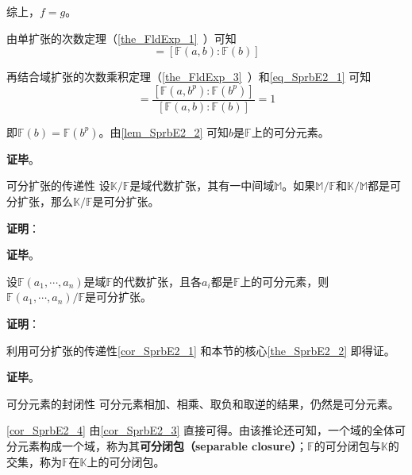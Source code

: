 综上，$f=g$。

由单扩张的次数定理（\autoref{the_FldExp_1}~）可知
\begin{equation}
[\mathbb{F}(a, b^p):\mathbb{F}(b^p)] = [\mathbb{F}(a, b):\mathbb{F}(b)]
\end{equation}

再结合域扩张的次数乘积定理（\autoref{the_FldExp_3}~）和\autoref{eq_SprbE2_1} 可知
\begin{equation}
[\mathbb{F}(b):\mathbb{F}(b^p)] = \frac{[\mathbb{F}(a, b^p):\mathbb{F}(b^p)]}{[\mathbb{F}(a, b):\mathbb{F}(b)]} = 1
\end{equation}

即$\mathbb{F}(b)=\mathbb{F}(b^p)$。由\autoref{lem_SprbE2_2} 可知$b$是$\mathbb{F}$上的可分元素。

\textbf{证毕}。











\begin{corollary}{可分扩张的传递性}\label{cor_SprbE2_1}
设$\mathbb{K}/\mathbb{F}$是域代数扩张，其有一中间域$\mathbb{M}$。如果$\mathbb{M}/\mathbb{F}$和$\mathbb{K}/\mathbb{M}$都是可分扩张，那么$\mathbb{K}/\mathbb{F}$是可分扩张。
\end{corollary}

\textbf{证明}：



\textbf{证毕}。





\begin{corollary}{}\label{cor_SprbE2_3}
设$\mathbb{F}(a_1, \cdots, a_n)$是域$\mathbb{F}$的代数扩张，且各$a_i$都是$\mathbb{F}$上的可分元素，则$\mathbb{F}(a_1, \cdots, a_n)/\mathbb{F}$是可分扩张。
\end{corollary}

\textbf{证明}：

利用可分扩张的传递性\autoref{cor_SprbE2_1} 和本节的核心\autoref{the_SprbE2_2} 即得证。

\textbf{证毕}。





\begin{corollary}{可分元素的封闭性}\label{cor_SprbE2_4}
可分元素相加、相乘、取负和取逆的结果，仍然是可分元素。
\end{corollary}

\autoref{cor_SprbE2_4} 由\autoref{cor_SprbE2_3} 直接可得。由该推论还可知，一个域的全体可分元素构成一个域，称为其\textbf{可分闭包（separable closure）}；$\mathbb{F}$的可分闭包与$\mathbb{K}$的交集，称为$\mathbb{F}$在$\mathbb{K}$上的可分闭包。











